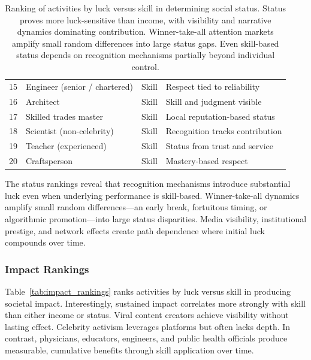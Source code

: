 \begin{table}[H]
\begin{tabular}{clll}
    15                     & Engineer (senior / chartered)             & Skill                  & Respect tied to reliability      \\
    16                     & Architect                                 & Skill                  & Skill and judgment visible       \\
    17                     & Skilled trades master                     & Skill                  & Local reputation-based status    \\
    18                     & Scientist (non-celebrity)                 & Skill                  & Recognition tracks contribution  \\
    19                     & Teacher (experienced)                     & Skill                  & Status from trust and service    \\
    20                     & Craftsperson                              & Skill                  & Mastery-based respect            \\
    \bottomrule
  \end{tabular}
  \caption{Ranking of activities by luck versus skill in determining
  social status. Status proves more luck-sensitive than income, with
  visibility and narrative dynamics dominating contribution. Winner-take-all
  attention markets amplify small random differences into large status gaps.
  Even skill-based status depends on recognition mechanisms partially
  beyond individual control.}
  \label{tab:status_rankings}
\end{table}

The status rankings reveal that recognition mechanisms introduce substantial
luck even when underlying performance is skill-based. Winner-take-all
dynamics amplify small random differences—an early break, fortuitous timing,
or algorithmic promotion—into large status disparities. Media visibility,
institutional prestige, and network effects create path dependence where
initial luck compounds over time.

\subsubsection{Impact Rankings}

Table~\ref{tab:impact_rankings} ranks activities by luck versus skill in
producing societal impact. Interestingly, sustained impact correlates
more strongly with skill than either income or status. Viral content creators
achieve visibility without lasting effect. Celebrity activism leverages
platforms but often lacks depth. In contrast, physicians, educators,
engineers, and public health officials produce measurable, cumulative
benefits through skill application over time.

